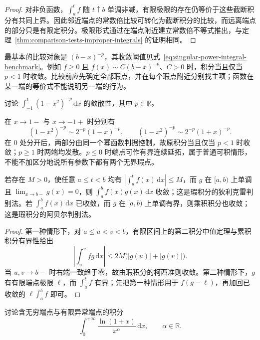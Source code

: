 \documentclass[UTF8,12pt,a4paper,fontset=fandol]{ctexbook}
\begin{document}
\begin{proof}
对非负函数，$\int_a^t f$ 随 $t\uparrow b$ 单调非减，有限极限的存在仍等价于这些截断积分有共同上界。因此邻近端点的常数倍比较可转化为截断积分的比较，而远离端点的部分只是有限定积分。极限形式通过在端点附近建立常数倍不等式推出，与定理~\ref{thm:comparison-tests-improper-integrals} 的证明相同。
\end{proof}

最基本的比较对象是 $(b-x)^{-p}$，其收敛阈值见式~\eqref{eq:singular-power-integral-benchmark}。例如 $f\geq0$ 且 $f(x)\sim C(b-x)^{-p}$、$C>0$ 时，积分当且仅当 $p<1$ 时收敛。比较前应先确定全部瑕点，并在每个瑕点附近分别找主项；函数在某一端的等价式不能说明另一端的行为。

\begin{example}
\label{ex:two-endpoint-singular-power-integral}
讨论 $\int_{-1}^1(1-x^2)^{-p}\,\mathrm{d}x$ 的敛散性，其中 $p\in\mathbb{R}$。
\end{example}

\begin{solve}
在 $x\to1-$ 与 $x\to-1+$ 时分别有
\[
    (1-x^2)^{-p}\sim2^{-p}(1-x)^{-p},\qquad
    (1-x^2)^{-p}\sim2^{-p}(1+x)^{-p}.
\]
在 $0$ 处分开后，两部分由同一个幂函数判据控制，故原积分当且仅当 $p<1$ 时收敛；$p\geq1$ 时两端均发散。$p\leq0$ 时端点可作有界连续延拓，属于普通可积情形，不能不加区分地说所有参数下都有两个无界瑕点。
\end{solve}

\begin{theorem}[瑕积分的狄利克雷与阿贝尔判别法]
\label{thm:dirichlet-abel-singular-integrals}
若存在 $M>0$，使任意 $a\leq t<b$ 均有 $|\int_a^t f(x)\,\mathrm{d}x|\leq M$，而 $g$ 在 $[a,b)$ 上单调且 $\lim_{x\to b-}g(x)=0$，则 $\int_a^b f(x)g(x)\,\mathrm{d}x$ 收敛；这是瑕积分的狄利克雷判别法。若 $\int_a^b f(x)\,\mathrm{d}x$ 已收敛，而 $g$ 在 $[a,b)$ 上单调有界，则乘积积分也收敛；这是瑕积分的阿贝尔判别法。
\end{theorem}

\begin{proof}
第一种情形下，对 $a\leq u<v<b$，有限区间上的第二积分中值定理与累积积分有界性给出
\[
    \left|\int_u^v fg\,\mathrm{d}x\right|
    \leq2M\bigl(|g(u)|+|g(v)|\bigr).
\]
当 $u,v\to b-$ 时右端一致趋于零，故由瑕积分的柯西准则收敛。第二种情形下，$g$ 有有限端点极限 $\ell$，而 $\int_a^t f$ 有界；先把第一种情形用于 $f(g-\ell)$，再加回已收敛的 $\ell\int_a^b f$ 即可。
\end{proof}

\begin{example}
\label{ex:mixed-logarithmic-improper-integral}
讨论含无穷端点与有限异常端点的积分
\[
    \int_0^{+\infty}\frac{\ln(1+x)}{x^\alpha}\,\mathrm{d}x,
    \qquad\alpha\in\mathbb{R}.
\]
\end{example}
\end{document}

